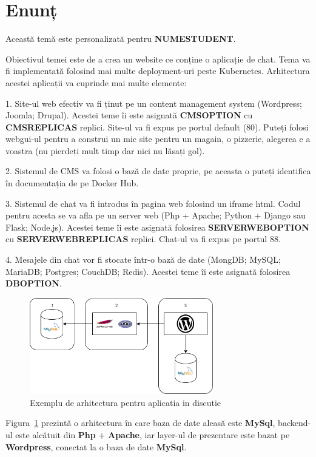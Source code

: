 \documentclass{article}
\newcounter{ProblemCounter} %
\newcommand{\ProblemName}{}
\newenvironment{Problem}[1][Sectiunea \arabic{ProblemCounter}]{ %
\stepcounter{ProblemCounter} %
\renewcommand{\ProblemName}{#1} %
\section{\ProblemName} %
}{}
\begin{document}
\begin{Problem}[Enunț]

Această temă este personalizată pentru \textbf{NUMESTUDENT}.

Obiectivul temei este de a crea un website ce conține o aplicație de chat. Tema va fi implementată folosind mai multe deployment-uri peste Kubernetes. Arhitectura acestei aplicații va cuprinde mai multe elemente:

1. Site-ul web efectiv va fi ținut pe un content management system (Wordpress; Joomla; Drupal). Acestei teme îi este asignată \textbf{CMSOPTION} cu \textbf{CMSREPLICAS} replici. Site-ul va fi expus pe portul default (80). Puteți folosi webgui-ul pentru a construi un mic site pentru un magain, o pizzerie, alegerea e a voastra (nu pierdeți mult timp dar nici nu lăsați gol).

2. Sistemul de CMS va folosi o bază de date proprie, pe aceasta o puteți identifica în documentația de pe Docker Hub.

3. Sistemul de chat va fi introdus în pagina web folosind un iframe html. Codul pentru acesta se va afla pe un server web (Php + Apache; Python + Django sau Flask; Node.js).
Acestei teme îi este asignată folosirea \textbf{SERVERWEBOPTION} cu \textbf{SERVERWEBREPLICAS} replici. Chat-ul va fi expus pe portul 88.

4. Mesajele din chat vor fi stocate într-o bază de date (MongDB; MySQL; MariaDB; Postgres; CouchDB; Redis).
Acestei teme îi este asignată folosirea \textbf{DBOPTION}.

\begin{figure}[th]
\centering
\includegraphics[width=8cm]{architecture_diagram.png}
  \caption{Exemplu de arhitectura pentru aplicatia in discutie}
  \label{fig:architecture_diagram}
\end{figure}

Figura~\ref{fig:architecture_diagram} prezintă o arhitectura în care baza de date aleasă este \textbf{MySql}, backend-ul este alcătuit din \textbf{Php} + \textbf{Apache}, iar layer-ul de prezentare este bazat pe \textbf{Wordpress}, conectat la o baza de date \textbf{MySql}.

\end{Problem}
\end{document}
